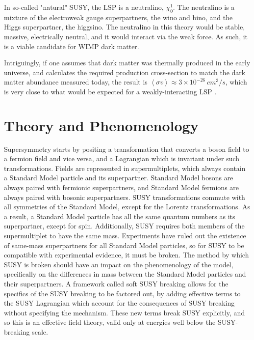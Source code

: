In so-called "natural" SUSY, the LSP is a neutralino, $\chi_0^{1}$.
The neutralino is a mixture of the electroweak gauge superpartners, the wino and bino, and the Higgs superpartner, the higgsino.
The neutralino in this theory would be stable, massive, electrically neutral, and it would interact via the weak force.
As such, it is a viable candidate for WIMP dark matter.

Intriguingly, if one assumes that dark matter was thermally produced in the early universe,
and calculates the required production cross-section to match the dark matter abundance measured today,
the result is $\left<\sigma v\right> \approx 3 \times 10^{-26}~cm^{3}/s$,
which is very close to what would be expected for a weakly-interacting LSP .\cite{susy-dark-matter-1996}

\section{Theory and Phenomenology}\label{sec:susy_theory}

Supersymmetry starts by positing a transformation that converts a boson field to a fermion field and vice versa,
and a Lagrangian which is invariant under such transformations.
Fields are represented in supermultiplets, which always contain a Standard Model particle and its superpartner.
Standard Model bosons are always paired with fermionic superpartners,
and Standard Model fermions are always paired with bosonic superpartners.
SUSY transformations commute with all symmetries of the Standard Model, except for the Lorentz transformations.
As a result, a Standard Model particle has all the same quantum numbers as its superpartner, except for spin.
Additionally, SUSY requires both members of the supermultiplet to have the same mass.
Experiments have ruled out the existence of same-mass superpartners for all Standard Model particles,
so for SUSY to be compatible with experimental evidence, it must be broken.
The method by which SUSY is broken should have an impact on the phenomenology of the model,
specifically on the differences in mass between the Standard Model particles and their superpartners.
A framework called soft SUSY breaking allows for the specifics of the SUSY breaking to be factored out,
by adding effective terms to the SUSY Lagrangian which account for the consequences of SUSY breaking without specifying the mechanism.
These new terms break SUSY explicitly, and so this is an effective field theory, valid only at energies well below the
SUSY-breaking scale.\cite{susy-soft-1981}


